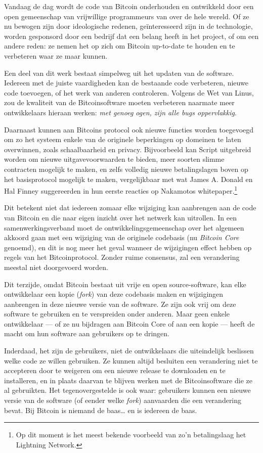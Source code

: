 \documentclass[
  a5paper,
  smalldemyvopaper,11pt,twoside,onecolumn,openright,extrafontsizes,
hidelinks]{memoir}
\begin{document}
Vandaag de dag wordt de code van Bitcoin onderhouden en ontwikkeld door
een open gemeenschap van vrijwillige programmeurs van over de hele
wereld. Of ze nu bewogen zijn door ideologische redenen, geïnteresseerd
zijn in de technologie, worden gesponsord door een bedrijf dat een
belang heeft in het project, of om een andere reden: ze nemen het op
zich om Bitcoin up-to-date te houden en te verbeteren waar ze maar
kunnen.

Een deel van dit werk bestaat simpelweg uit het updaten van de software.
Iedereen met de juiste vaardigheden kan de bestaande code verbeteren,
nieuwe code toevoegen, of het werk van anderen controleren. Volgens de
Wet van Linus, zou de kwaliteit van de Bitcoinsoftware moeten verbeteren
naarmate meer ontwikkelaars hieraan werken: \emph{met genoeg ogen, zijn
alle bugs oppervlakkig}.

Daarnaast kunnen aan Bitcoins protocol ook nieuwe functies worden
toegevoegd om zo het systeem enkele van de originele beperkingen op
domeinen te laten overwinnen, zoals schaalbaarheid en privacy.
Bijvoorbeeld kan Script uitgebreid worden om nieuwe uitgavevoorwaarden
te bieden, meer soorten slimme contracten mogelijk te maken, en zelfs
volledig nieuwe betalingslagen boven op het basisprotocol mogelijk te
maken, vergelijkbaar met wat James A. Donald en Hal Finney suggereerden
in hun eerste reacties op Nakamotos whitepaper.\footnote{Op dit moment
  is het meest bekende voorbeeld van zo'n betalingslaag het Lightning
  Network.}

Dit betekent niet dat iedereen zomaar elke wijziging kan aanbrengen aan
de code van Bitcoin en die naar eigen inzicht over het netwerk kan
uitrollen. In een samenwerkingsverband moet de ontwikkelingsgemeenschap
over het algemeen akkoord gaan met een wijziging van de originele
codebasis (nu \emph{Bitcoin Core} genoemd), en dit is nog meer het geval
wanneer de wijzigingen effect hebben op regels van het Bitcoinprotocol.
Zonder ruime consensus, zal een verandering meestal niet doorgevoerd
worden.

Dit terzijde, omdat Bitcoin bestaat uit vrije en open source-software,
kan elke ontwikkelaar een kopie (\emph{fork}) van deze codebasis maken
en wijzigingen aanbrengen in deze nieuwe versie van de software. Ze zijn
ook vrij om deze software te gebruiken en te verspreiden onder anderen.
Maar geen enkele ontwikkelaar --- of ze nu bijdragen aan Bitcoin Core of
aan een kopie --- heeft de macht om hun software aan gebruikers op te
dringen.

Inderdaad, het zijn de gebruikers, niet de ontwikkelaars die
uiteindelijk beslissen welke code ze willen gebruiken. Ze kunnen altijd
besluiten een verandering niet te accepteren door te weigeren om een
nieuwe release te downloaden en te installeren, en in plaats daarvan te
blijven werken met de Bitcoinsoftware die ze al gebruikten. Het
tegenovergestelde is ook waar: gebruikers kunnen een nieuwe versie van
de software (of eender welke \emph{fork}) aanvaarden die een verandering
bevat. Bij Bitcoin is niemand de baas\ldots{} en is iedereen de baas.
\end{document}
